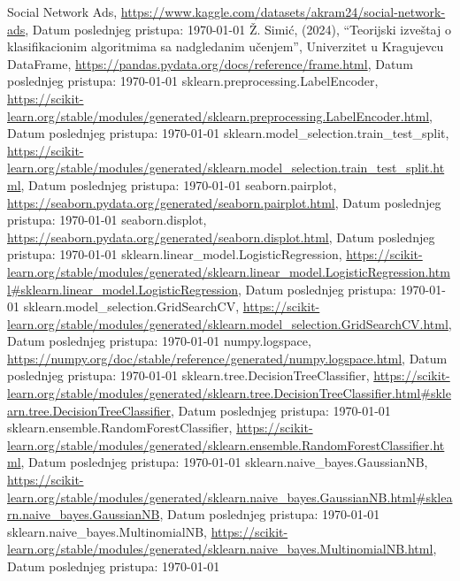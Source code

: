 \documentclass[fontsize=12bp, paper=a4]{scrarticle}
\begin{document}
\newpage

\begin{thebibliography}{1}
    Social Network Ads, \url{https://www.kaggle.com/datasets/akram24/social-network-ads}, Datum poslednjeg pristupa: \today
    Ž. Simić, (2024), ``Teorijski izveštaj o klasifikacionim algoritmima sa nadgledanim učenjem'', Univerzitet u Kragujevcu
    DataFrame, \url{https://pandas.pydata.org/docs/reference/frame.html}, Datum poslednjeg pristupa: \today
    sklearn.preprocessing.LabelEncoder, \url{https://scikit-learn.org/stable/modules/generated/sklearn.preprocessing.LabelEncoder.html}, Datum poslednjeg pristupa: \today
    {sklearn.model\_selection.train\_test\_split}, \url{https://scikit-learn.org/stable/modules/generated/sklearn.model_selection.train_test_split.html}, Datum poslednjeg pristupa: \today
    seaborn.pairplot, \url{https://seaborn.pydata.org/generated/seaborn.pairplot.html}, Datum poslednjeg pristupa: \today
    seaborn.displot, \url{https://seaborn.pydata.org/generated/seaborn.displot.html}, Datum poslednjeg pristupa: \today
    sklearn.linear\_model.LogisticRegression, \url{https://scikit-learn.org/stable/modules/generated/sklearn.linear\_model.LogisticRegression.html#sklearn.linear_model.LogisticRegression}, Datum poslednjeg pristupa: \today
    sklearn.model\_selection.GridSearchCV, \url{https://scikit-learn.org/stable/modules/generated/sklearn.model\_selection.GridSearchCV.html}, Datum poslednjeg pristupa: \today
    numpy.logspace, \url{https://numpy.org/doc/stable/reference/generated/numpy.logspace.html}, Datum poslednjeg pristupa: \today
    sklearn.tree.DecisionTreeClassifier, \url{https://scikit-learn.org/stable/modules/generated/sklearn.tree.DecisionTreeClassifier.html#sklearn.tree.DecisionTreeClassifier}, Datum poslednjeg pristupa: \today
    sklearn.ensemble.RandomForestClassifier, \url{https://scikit-learn.org/stable/modules/generated/sklearn.ensemble.RandomForestClassifier.html}, Datum poslednjeg pristupa: \today
    sklearn.naive\_bayes.GaussianNB, \url{https://scikit-learn.org/stable/modules/generated/sklearn.naive\_bayes.GaussianNB.html#sklearn.naive\_bayes.GaussianNB}, Datum poslednjeg pristupa: \today
    sklearn.naive\_bayes.MultinomialNB, \url{https://scikit-learn.org/stable/modules/generated/sklearn.naive\_bayes.MultinomialNB.html}, Datum poslednjeg pristupa: \today

\end{thebibliography}
\end{document}
